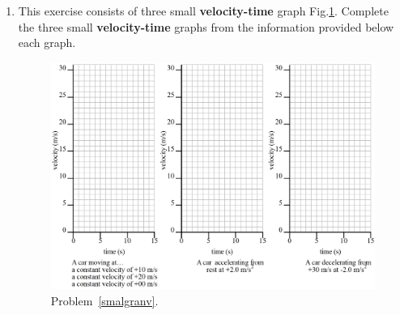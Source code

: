 \documentclass[A4,12pt]{article}
\begin{document}
\begin{enumerate}[label=\bfseries (\arabic*)]
\item \label{smalgranv} This exercise consists of three small \textbf{velocity-time} graph Fig.\ref{mokoa}. Complete the three small \textbf{velocity-time} graphs from the information provided below each graph.
\begin{figure}[H]
    \centering
    \includegraphics[width=0.9\columnwidth]{3vel.png}
    \caption{Problem~\ref{smalgranv}.}
    \label{mokoa}
\end{figure}




















\end{enumerate}
\end{document}
